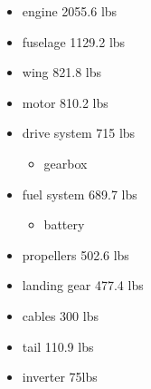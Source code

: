 \begin{itemize}

    \item engine  2055.6 lbs
    \item fuselage 1129.2 lbs
    \item wing 821.8 lbs
    \item motor 810.2 lbs
    \item drive system 715 lbs
        \begin{itemize}
            \item gearbox
        \end{itemize}
    \item fuel system 689.7 lbs
        \begin{itemize}
            \item battery
        \end{itemize}
    \item propellers 502.6 lbs
    \item landing gear 477.4 lbs
    \item cables 300 lbs
    \item tail 110.9 lbs
    \item inverter 75lbs
\end{itemize}



